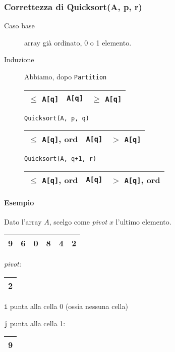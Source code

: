 \subsubsection{Correttezza di Quicksort(A, p, r)}
\begin{description}
	\item[Caso base] array già ordinato, 0 o 1 elemento.
	\item[Induzione] Abbiamo, dopo \texttt{Partition}
	\begin{center}
		\begin{tabular}{| l | l | l |}
			\hline
			$\leq$ \texttt{A[q]} & \texttt{A[q]} & $\geq$ \texttt{A[q]} \\
			\hline 
		\end{tabular}
	\end{center}
	\texttt{Quicksort(A, p, q)} 
	\begin{tabular}{|l|l|l|}
		\hline
		$\leq$ \texttt{A[q]}, ord & \texttt{A[q]} & $>$ \texttt{A[q]} \\
		\hline
	\end{tabular} \par
	\texttt{Quicksort(A, q+1, r)} 
	\begin{tabular}{|l|l|l|}
		\hline
		$\leq$ \texttt{A[q]}, ord & \texttt{A[q]} & $>$ \texttt{A[q]}, ord \\
		\hline
	\end{tabular}
\end{description}

\paragraph{Esempio}

Dato l'array $A$, scelgo come \emph{pivot} $x$ l'ultimo elemento.

\begin{center}
	\begin{tabular}{|l|l|l|l|l|l|}
		\hline
		9 & 6 & 0 & 8 & 4 & 2 \\
		\hline
	\end{tabular}
	\hspace{1cm}
	\emph{pivot: }
	\begin{tabular}{|l|}
		\hline
		2 \\
		\hline
	\end{tabular}
\end{center}

\texttt{i} punta alla cella 0 (ossia nessuna cella) \par
\texttt{j} punta alla cella 1:
\begin{tabular}{|l|}
	\hline
	9 \\
	\hline
\end{tabular}

